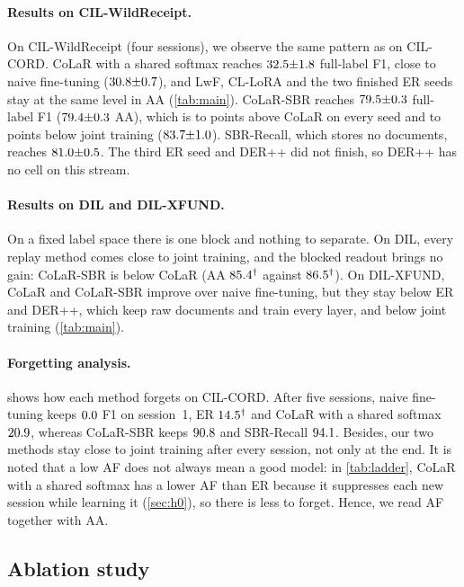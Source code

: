 \documentclass[10pt,twocolumn,letterpaper]{article}
\begin{document}
\paragraph{Results on CIL-WildReceipt.} On CIL-WildReceipt (four sessions), we observe the same pattern as on CIL-CORD. CoLaR with a shared softmax reaches $32.5{\pm}1.8$ full-label F1, close to naive fine-tuning ($30.8{\pm}0.7$), and LwF, CL-LoRA and the two finished ER seeds stay at the same level in AA (\cref{tab:main}). CoLaR-SBR reaches $79.5{\pm}0.3$ full-label F1 ($79.4{\pm}0.3$ AA), which is \nWildSbrMinusColarFullMin{} to \nWildSbrMinusColarFullMax{} points above CoLaR on every seed and \nWildJointMinusSbrFullMin{} to \nWildJointMinusSbrFullMax{} points below joint training ($83.7{\pm}1.0$). SBR-Recall, which stores no documents, reaches $81.0{\pm}0.5$. The third ER seed and DER++ did not finish, so DER++ has no cell on this stream.

\paragraph{Results on DIL and DIL-XFUND.} On a fixed label space there is one block and nothing to separate. On DIL, every replay method comes close to joint training, and the blocked readout brings no gain: CoLaR-SBR is below CoLaR (AA $85.4^\dagger$ against $86.5^\dagger$). On DIL-XFUND, CoLaR and CoLaR-SBR improve over naive fine-tuning, but they stay below ER and DER++, which keep raw documents and train every layer, and below joint training (\cref{tab:main}).

\paragraph{Forgetting analysis.}  shows how each method forgets on CIL-CORD. After five sessions, naive fine-tuning keeps $0.0$ F1 on session~1, ER $14.5^\dagger$ and CoLaR with a shared softmax $20.9$, whereas CoLaR-SBR keeps $90.8$ and SBR-Recall $94.1$. Besides, our two methods stay close to joint training after every session, not only at the end. It is noted that a low AF does not always mean a good model: in \cref{tab:ladder}, CoLaR with a shared softmax has a lower AF than ER because it suppresses each new session while learning it (\cref{sec:h0}), so there is less to forget. Hence, we read AF together with AA.

\subsection{Ablation study}
\label{sec:ablations}
\end{document}

